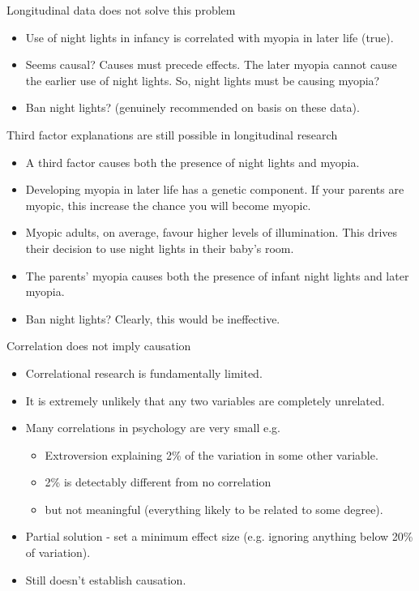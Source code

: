 \documentclass{beamer}
\begin{document}
\begin{frame}{Longitudinal data does not solve this problem}
\begin{itemize}
\item Use of night lights in infancy is correlated with myopia in later life (true).
\vspace{12 pt}
\item Seems causal? Causes must precede effects. The later myopia cannot cause the earlier use of night lights.
So, night lights must be causing myopia?

\item Ban night lights? (genuinely recommended on basis on these data).
\end{itemize}
\end{frame}



\begin{frame}{Third factor explanations are still possible in longitudinal research}
\begin{itemize}
\item A third factor causes both the presence of night lights and myopia.
\item Developing myopia in later life has a genetic component. If your parents are myopic, this increase the chance you will become myopic.
\item Myopic adults, on average, favour higher levels of illumination. This drives their decision to use night lights in their baby's room. 
\item The parents' myopia causes both the presence of infant night lights and later myopia.
\item Ban night lights? Clearly, this would be ineffective.
\end{itemize}
\end{frame}



\begin{frame}{Correlation does not imply causation}
\begin{itemize}
\item Correlational research is fundamentally limited.
\item It is extremely unlikely that any two variables are completely unrelated.
\item Many correlations in psychology are very small e.g.
\begin{itemize}
\item Extroversion explaining 2\% of the variation in some other variable.
\item 2\% is detectably different from no correlation
\item but not meaningful (everything likely to be related to some degree).
\end{itemize}
\item Partial solution - set a minimum effect size (e.g. ignoring anything below 20\% of variation).
\item Still doesn't establish causation.
\end{itemize}
\end{frame}
\end{document}
